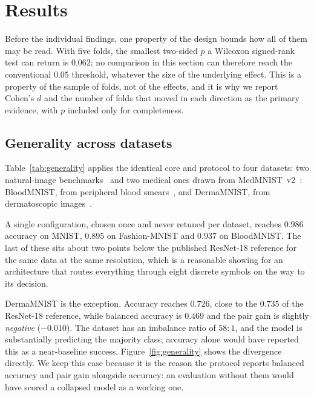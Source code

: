 %
%

\section{Results}
\label{sec:results}

Before the individual findings, one property of the design bounds how all of
them may be read. With five folds, the smallest two-sided $p$ a Wilcoxon
signed-rank test can return is $0.062$; no comparison in this section can
therefore reach the conventional $0.05$ threshold, whatever the size of the
underlying effect. This is a property of the sample of folds, not of the
effects, and it is why we report Cohen's $d$ and the number of folds that moved
in each direction as the primary evidence, with $p$ included only for
completeness.

\subsection{Generality across datasets}

Table~\ref{tab:generality} applies the identical core and protocol to four
datasets: two natural-image benchmarks~\cite{lecun1998mnist,xiao2017fashion} and two medical ones
drawn from MedMNIST~v2~\cite{yang2023medmnist}: BloodMNIST, from peripheral blood
smears~\cite{acevedo2020blood}, and DermaMNIST, from dermatoscopic
images~\cite{tschandl2018ham10000}.



A single configuration, chosen once and never retuned per dataset, reaches
$0.986$ accuracy on MNIST, $0.895$ on Fashion-MNIST and $0.937$ on BloodMNIST.
The last of these sits about two points below the published ResNet-18 reference
for the same data at the same resolution, which is a reasonable showing for an
architecture that routes everything through eight discrete symbols on the way
to its decision.

DermaMNIST is the exception. Accuracy reaches $0.726$, close to the
$0.735$ of the ResNet-18 reference, while balanced accuracy is $0.469$ and the
pair gain is slightly \emph{negative} ($-0.010$). The dataset has an imbalance
ratio of $58{:}1$, and the model is substantially predicting the majority class;
accuracy alone would have reported this as a near-baseline success.
Figure~\ref{fig:generality} shows the divergence directly. We keep this case
because it is the reason the protocol reports balanced accuracy and pair gain
alongside accuracy: an evaluation without them would have scored a collapsed
model as a working one.

